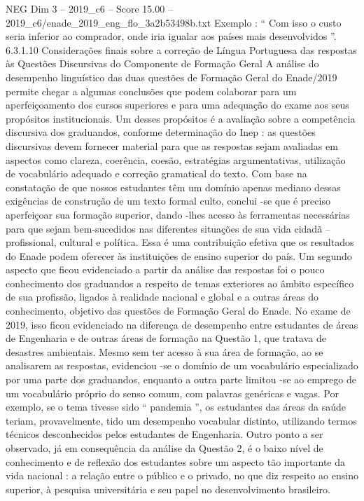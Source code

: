 \begin{textsample}{NEG Dim 3 – 2019\_c6 – Score 15.00 – 2019\_c6/enade\_2019\_eng\_flo\_3a2b53498b.txt}
Exemplo : “ Com isso o custo seria inferior ao comprador, onde iria igualar aos países mais desenvolvidos ”. 6.3.1.10 Considerações finais sobre a correção de Língua Portuguesa das respostas às Questões Discursivas do Componente de Formação Geral A análise do desempenho linguístico das duas questões de Formação Geral do Enade/2019 permite chegar a algumas conclusões que podem colaborar para um aperfeiçoamento dos cursos superiores e para uma adequação do exame aos seus propósitos institucionais.
Um desses propósitos é a avaliação sobre a competência discursiva dos graduandos, conforme determinação do Inep : as questões discursivas devem fornecer material para que as respostas sejam avaliadas em aspectos como clareza, coerência, coesão, estratégias argumentativas, utilização de vocabulário adequado e correção gramatical do texto.
Com base na constatação de que nossos estudantes têm um domínio apenas mediano dessas exigências de construção de um texto formal culto, conclui -se que é preciso aperfeiçoar sua formação superior, dando -lhes acesso às ferramentas necessárias para que sejam bem-sucedidos nas diferentes situações de sua vida cidadã – profissional, cultural e política.
Essa é uma contribuição efetiva que os resultados do Enade podem oferecer às instituições de ensino superior do país.
Um segundo aspecto que ficou evidenciado a partir da análise das respostas foi o pouco conhecimento dos graduandos a respeito de temas exteriores ao âmbito específico de sua profissão, ligados à realidade nacional e global e a outras áreas do conhecimento, objetivo das questões de Formação Geral do Enade.
No exame de 2019, isso ficou evidenciado na diferença de desempenho entre estudantes de áreas de Engenharia e de outras áreas de formação na Questão 1, que tratava de desastres ambientais.
Mesmo sem ter acesso à sua área de formação, ao se analisarem as respostas, evidenciou -se o domínio de um vocabulário especializado por uma parte dos graduandos, enquanto a outra parte limitou -se ao emprego de um vocabulário próprio do senso comum, com palavras genéricas e vagas.
Por exemplo, se o tema tivesse sido “ pandemia ”, os estudantes das áreas da saúde teriam, provavelmente, tido um desempenho vocabular distinto, utilizando termos técnicos desconhecidos pelos estudantes de Engenharia.
Outro ponto a ser observado, já em consequência da análise da Questão 2, é o baixo nível de conhecimento e de reflexão dos estudantes sobre um aspecto tão importante da vida nacional : a relação entre o público e o privado, no que diz respeito ao ensino superior, à pesquisa universitária e seu papel no desenvolvimento brasileiro.

\end{textsample}
